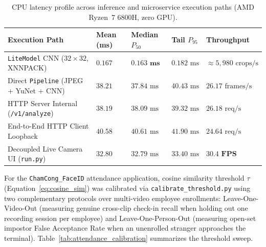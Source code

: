 \begin{table}[htbp]
\centering
\caption{CPU latency profile across inference and microservice execution paths (AMD Ryzen~7 6800H, zero GPU).}
\label{tab:latency_profile}
\small
\begin{tabular}{L{5.1cm}R{1.9cm}R{2.0cm}R{1.9cm}R{2.3cm}}
\toprule
\textbf{Execution Path} & \textbf{Mean (ms)} & \textbf{Median $P_{50}$} & \textbf{Tail $P_{95}$} & \textbf{Throughput} \\
\midrule
\texttt{LiteModel} CNN ($32\times32$, XNNPACK) & $0.167$ & $\mathbf{0.163\text{ ms}}$ & $0.182\text{ ms}$ & $\approx 5{,}980\text{ crops/s}$ \\
Direct \texttt{Pipeline} (JPEG + YuNet + CNN) & $38.21$ & $37.84\text{ ms}$ & $40.43\text{ ms}$ & $26.17\text{ frames/s}$ \\
HTTP Server Internal (\texttt{/v1/analyze}) & $38.19$ & $38.09\text{ ms}$ & $39.32\text{ ms}$ & $26.18\text{ req/s}$ \\
End-to-End HTTP Client Loopback & $40.58$ & $40.61\text{ ms}$ & $41.90\text{ ms}$ & $24.64\text{ req/s}$ \\
Decoupled Live Camera UI (\texttt{run.py}) & $32.80$ & $32.79\text{ ms}$ & $33.40\text{ ms}$ & $\mathbf{30.4\text{ FPS}}$ \\
\bottomrule
\end{tabular}
\end{table}

For the \texttt{ChamCong\_FaceID} attendance application, cosine similarity threshold $\tau$ (Equation~\eqref{eq:cosine_sim}) was calibrated via \texttt{calibrate\_threshold.py} using two complementary protocols over multi-video employee enrollments: Leave-One-Video-Out (measuring genuine cross-clip check-in recall when holding out one recording session per employee) and Leave-One-Person-Out (measuring open-set impostor False Acceptance Rate when an unenrolled stranger approaches the terminal). Table~\ref{tab:attendance_calibration} summarizes the threshold sweep.

